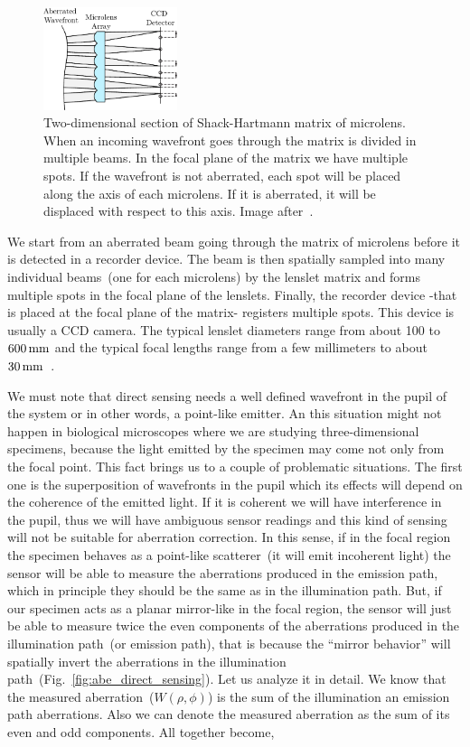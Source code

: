 \begin{figure}[htbp]
	\centering
		\includegraphics[width=0.35\textwidth]{images/SH}
	\caption{Two-dimensional section of Shack-Hartmann matrix of microlens. When an incoming wavefront goes through the matrix is divided in multiple beams. In the focal plane of the matrix we have multiple spots. If the wavefront is not aberrated, each spot will be placed along the axis of each microlens. If it is aberrated, it will be displaced with respect to this axis. Image after~\cite{optical_shop_testing}.}
	\label{fig:SH}
\end{figure}


We start from an aberrated beam going through the matrix of microlens before it is detected in a recorder device. The beam is then spatially sampled into many individual beams~(one for each microlens) by the lenslet matrix and forms multiple spots in the focal plane of the lenslets. Finally, the recorder device -that is placed at the focal plane of the matrix- registers multiple spots. This device is usually a CCD camera. The typical lenslet diameters range from about 100 to $\unit[600]{mm}$ and the typical focal lengths range from a few millimeters to about $\unit[30]{mm}$~\cite{AO_vision_science}.
  
We must note that direct sensing needs a well defined wavefront in the pupil of the system or in other words, a point-like emitter. An this situation might not happen in biological microscopes where we are studying three-dimensional specimens, because the light emitted by the specimen may come not only from the focal point. This fact brings us to a couple of problematic situations. The first one is the superposition of wavefronts in the pupil which its effects will depend on the coherence of the emitted light. If it is coherent we will have interference in the pupil, thus we will have ambiguous sensor readings and this kind of sensing will not be suitable for aberration correction. In this sense, if in the focal region the specimen behaves as a point-like scatterer~(it will emit incoherent light) the sensor will be able to measure the aberrations produced in the emission path, which in principle they should be the same as in the illumination path. But, if our specimen acts as a planar mirror-like in the focal region, the sensor will just be able to measure twice the even components of the aberrations produced in the illumination path~(or emission path), that is because the "`mirror behavior"' will spatially invert the aberrations in the illumination path~(Fig.~\ref{fig:abe_direct_sensing}). Let us analyze it in detail. We know that the measured aberration~($W(\rho,\phi)$) is the sum of the illumination an emission path aberrations. Also we can denote the measured aberration as the sum of its even and odd components. All together become,  

